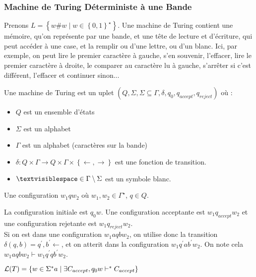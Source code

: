 \documentclass{cours}
\begin{document}
\subsubsection{Machine de Turing Déterministe à une Bande}
Prenons $L = \left\{w \# w \mid w \in \left\{0, 1\right\}^{\star}\right\}$. Une machine de Turing contient une mémoire, qu'on représente par une bande, et une tête de lecture et d'écriture, qui peut accéder à une case, et la remplir ou d'une lettre, ou d'un blanc. Ici, par exemple, on peut lire le premier caractère à gauche, s'en souvenir, l'effacer, lire le premier caractère à droite, le comparer au caractère lu à gauche, s'arrêter si c'est différent, l'effacer et continuer sinon...

\begin{definition}
    Une machine de Turing est un uplet $\left(Q, \Sigma, \Sigma \subseteq \Gamma, \delta, q_{0}, q_{accept}, q_{reject}\right)$ où :
    \begin{itemize}
        \item $Q$ est un ensemble d'états
        \item $\Sigma$ est un alphabet
        \item $\Gamma$ est un alphabet (caractères sur la bande)
        \item $\delta : Q \times \Gamma \rightarrow Q \times \Gamma \times \left\{\leftarrow, \rightarrow\right\}$ est une fonction de transition.
        \item $\textvisiblespace \in \Gamma \setminus \Sigma$ est un symbole blanc.
    \end{itemize}

    Une configuration $w_{1}qw_{2}$ où $w_{1}, w_{2} \in \Gamma^{\star}$, $q\in Q$. 
\end{definition}

\begin{definition}
    La configuration initiale est $q_{0}w$. Une configuration acceptante est $w_{1}q_{accept}w_{2}$ et une configuration rejetante est $w_{1}q_{reject}w_{2}$.\\
    Si on est dans une configuration $w_{1}aqbw_{2}$, on utilise donc la transition $\delta(q, b) = q^{'}, b^{'} \leftarrow$, et on atterit dans la configuration $w_{1}q^{'}ab^{'}w_{2}$. On note cela $w_{1}aqbw_{2} \vdash w_{1}q^{'}qb^{'}w_{2}$.
\end{definition}

\begin{definition}
    $\mathcal{L}(T) = \left\{w \in \Sigma^{*}a\mid \exists C_{accept}, q_{0}w \vdash^{*} C_{accept}\right\}$
\end{definition}
\end{document}
